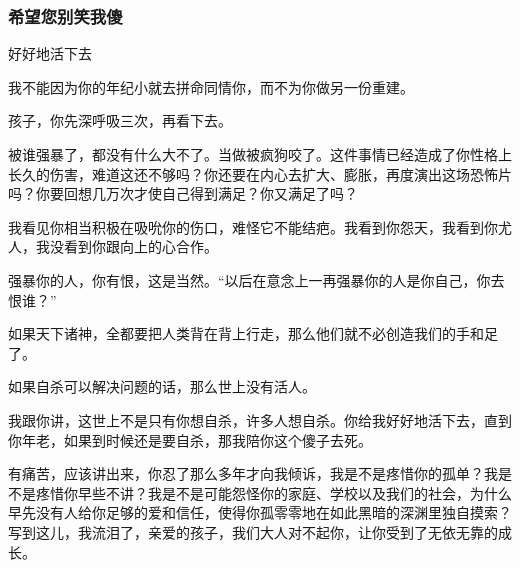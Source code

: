 \subsubsection{希望您别笑我傻}

\begin{center}
    \par 好好地活下去
\end{center}
\par {}
\par 我不能因为你的年纪小就去拼命同情你，而不为你做另一份重建。
\par 孩子，你先深呼吸三次，再看下去。
\par 被谁强暴了，都没有什么大不了。当做被疯狗咬了。这件事情已经造成了你性格上长久的伤害，难道这还不够吗？你还要在内心去扩大、膨胀，再度演出这场恐怖片吗？你要回想几万次才使自己得到满足？你又满足了吗？
\par 我看见你相当积极在吸吮你的伤口，难怪它不能结疤。我看到你怨天，我看到你尤人，我没看到你跟向上的心合作。
\par 强暴你的人，你有恨，这是当然。“以后在意念上一再强暴你的人是你自己，你去恨谁？”
\par 如果天下诸神，全都要把人类背在背上行走，那么他们就不必创造我们的手和足了。
\par 如果自杀可以解决问题的话，那么世上没有活人。
\par 我跟你讲，这世上不是只有你想自杀，许多人想自杀。你给我好好地活下去，直到你年老，如果到时候还是要自杀，那我陪你这个傻子去死。
\par 有痛苦，应该讲出来，你忍了那么多年才向我倾诉，我是不是疼惜你的孤单？我是不是疼惜你早些不讲？我是不是可能怨怪你的家庭、学校以及我们的社会，为什么早先没有人给你足够的爱和信任，使得你孤零零地在如此黑暗的深渊里独自摸索？写到这儿，我流泪了，亲爱的孩子，我们大人对不起你，让你受到了无依无靠的成长。
